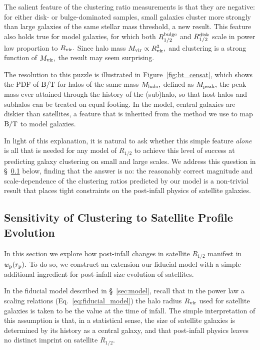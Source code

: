 \documentclass[usenatbib,usegraphicx,letterpaper]{mn2e}
\newcommand{\rhalf}{R_{1/2}}
\newcommand{\rhalfdisk}{R_{1/2}^{\rm disk}}
\newcommand{\rhalfbulge}{R_{1/2}^{\rm bulge}}
\newcommand{\bt}{{\rm B/T}}
\newcommand{\mvir}{M_{\rm vir}}
\newcommand{\mpeak}{M_{\rm peak}}
\newcommand{\mhalo}{M_{\rm halo}}
\newcommand{\rvir}{R_{\rm vir}}
\newcommand{\rproj}{r_{\rm p}}
\newcommand{\wproj}{w_{\rm p}}
\begin{document}
The salient feature of the clustering ratio measurements is that they are negative: for either disk- or bulge-dominated samples, small galaxies cluster more strongly than large galaxies of the same stellar mass threshold, a new result. This feature also holds true for model galaxies, for which both $\rhalfbulge$ and $\rhalfdisk$ scale in power law proportion to $\rvir.$ Since halo mass $\mvir\propto\rvir^{3},$ and clustering is a strong function of $\mvir,$ the result may seem surprising.

The resolution to this puzzle is illustrated in Figure~\ref{fig:bt_censat}, which shows the PDF of $\bt$ for halos of the same mass $\mhalo,$ defined as $\mpeak,$ the peak mass ever attained through the history of the (sub)halo, so that host halos and subhalos can be treated on equal footing. In the model, central galaxies are diskier than satellites, a feature that is inherited from the method we use to map $\bt$ to model galaxies.

In light of this explanation, it is natural to ask whether this simple feature {\em alone} is all that is needed for any model of $\rhalf$ to achieve this level of success at predicting galaxy clustering on small and large scales. We address this question in \S~\ref{subsec:tests2} below, finding that the answer is no: the reasonably correct magnitude and scale-dependence of the clustering ratios predicted by our model is a non-trivial result that places tight constraints on the post-infall physics of satellite galaxies.

\subsection{Sensitivity of Clustering to Satellite Profile Evolution}
\label{subsec:tests2}

In this section we explore how post-infall changes in satellite $\rhalf$ manifest in $\wproj(\rproj).$ To do so, we construct an extension our fiducial model with a simple additional ingredient for post-infall size evolution of satellites.

In the fiducial model described in \S~\ref{sec:model}, recall that in the power law a scaling relations (Eq.~\ref{eq:fiducial_model}) the halo radius $\rvir$ used for satellite galaxies is taken to be the value at the time of infall. The simple interpretation of this assumption is that, in a statistical sense, the size of satellite galaxies is determined by its history as a central galaxy, and that post-infall physics leaves no distinct imprint on satellite $\rhalf.$
\end{document}
